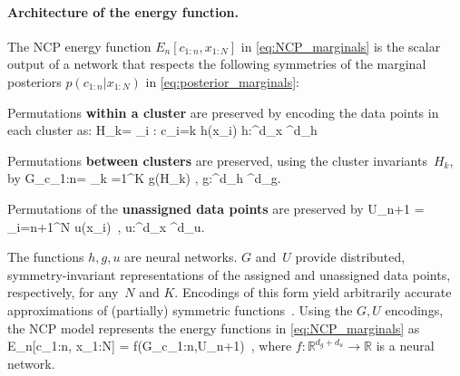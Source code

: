 \paragraph{Architecture of the energy function.} The NCP energy function $E_n[c_{1:n}, x_{1:N}]$ in \autoref{eq:NCP_marginals}
is the scalar output of 
a network that respects the following symmetries of the marginal posteriors $p(c_{1:n}| x_{1:N})$ in \autoref{eq:posterior_marginals}: 
\begin{myitemize}

	\item Permutations {\bf within a cluster}	
 are preserved by encoding the data points in each cluster as: 
	\eqan
	H_k= \sum_{i : c_{i}=k} h(x_i)  %
	\quad h:^{d_x} \rightarrow {}^{d_h}
	\label{Hk}
	\enan 

 \item Permutations {\bf  between clusters}
 are preserved, using the cluster invariants~$H_k$,  by 
	\eqan 
	G_{c_{1:n}}= \sum_{k =1}^K g(H_k) ,
	\quad 
	g:^{d_h} \rightarrow {}^{d_g}.
	\label{G_def}
	\enan 			

	\item Permutations of the {\bf  unassigned data points} are preserved  by 
	\eqan 
	U_{n+1} = \sum_{i=n+1}^{N}  u(x_i) \,,
		\qquad 
	u:^{d_x} \rightarrow {}^{d_u}.
	\label{Q}
	\enan 		
	\end{myitemize} 

The functions $h,g,u$ are neural networks.  
$G$ and~$U$ provide distributed, 
symmetry-invariant representations of the assigned and unassigned data points, respectively, for any~$N$ and $K$.  
Encodings of this form 
yield arbitrarily accurate approximations 
of (partially) symmetric 
functions~\citep{deep_sets,gui2021pine}.
Using the $G,U$ encodings, 
the NCP model represents the energy functions in \autoref{eq:NCP_marginals} as 
\eqan 
E_n[c_{1:n}, x_{1:N}] = f(G_{c_{1:n}},U_{n+1}) \,,
\label{eq:unnormalized_marginal}
\enan 
where $	f:\mathbb{R}^{d_g + d_u} \rightarrow \mathbb{R}$ is a neural network.













